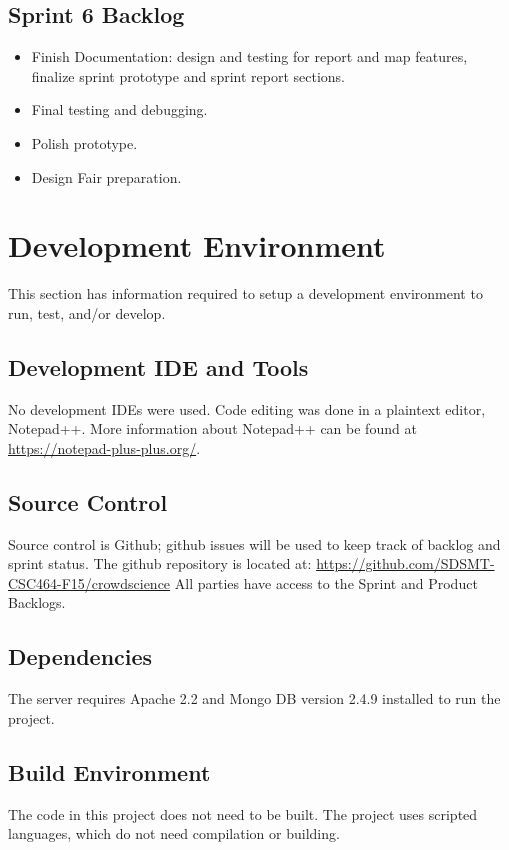\subsection{Sprint 6 Backlog}
\begin{itemize}
\itemsep0em
\item Finish Documentation: design and testing for report and map features, finalize sprint prototype and sprint report sections.
\item Final testing and debugging.
\item Polish prototype.
\item Design Fair preparation.
\end{itemize}


\section{Development Environment}
This section has information required to setup a development environment to run, test, and/or develop. 

\subsection{Development IDE and Tools}
No development IDEs were used. Code editing was done in a plaintext editor, Notepad++. More information about Notepad++ can be found at \url{https://notepad-plus-plus.org/}.

\subsection{Source  Control}
Source control is Github; github issues will be used to keep track of backlog and sprint status. The github repository is located at: \url{https://github.com/SDSMT-CSC464-F15/crowdscience} All parties have access to the Sprint and Product Backlogs.

\subsection{Dependencies}
The server requires Apache 2.2 and Mongo DB version 2.4.9 installed to run the project.

\subsection{Build  Environment}
The code in this project does not need to be built. The project uses scripted languages, which do not need compilation or building. 


